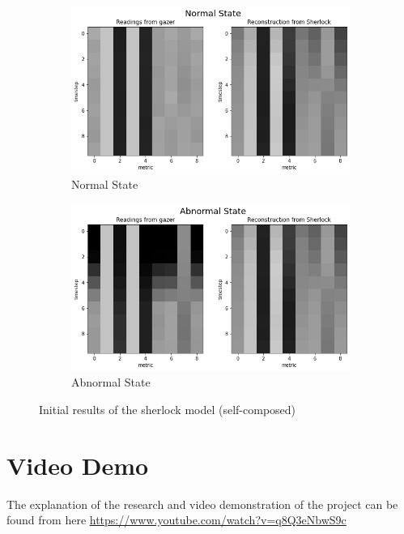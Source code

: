 \begin{figure}[H]
    \centering
    \begin{subfigure}[b]{0.7\textwidth}
        \centering
        \includegraphics[width=\textwidth]{assets/implementation/normal-state.png}
        \caption{Normal State}
        \label{fig:normal-state}
    \end{subfigure}
    \hfill
    \begin{subfigure}[b]{0.7\textwidth}
        \centering
        \includegraphics[width=\textwidth]{assets/implementation/abnormal-state.png}
        \caption{Abnormal State}
        \label{fig:abnormal-state}
    \end{subfigure}
    \hfill
       \caption{Initial results of the \ac{sherlock} model (self-composed)}
\end{figure}

\section{Video Demo}

The explanation of the research and video demonstration of the project can be found from here \href{https://www.youtube.com/watch?v=q8Q3eNbwS9c}{https://www.youtube.com/watch?v=q8Q3eNbwS9c}